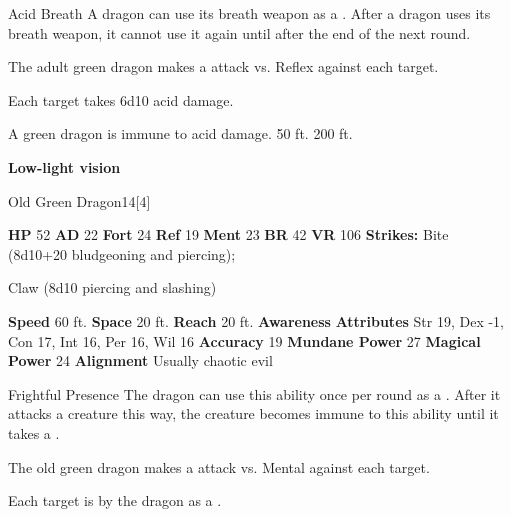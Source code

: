    \begin{freeability}{Acid Breath}
      A dragon can use its breath weapon as a .
      After a dragon uses its breath weapon, it cannot use it again until after the end of the next round.
      \par The adult green dragon makes a  attack
        vs. Reflex against each target.
    
    \hit Each target takes 6d10 acid damage.
    \end{freeability}
  
      
       A green dragon is immune to acid damage.
     50 ft.
     200 ft.
    \par\noindent\textbf{Low-light vision}
  

  \begin{monsubsection}{Old Green Dragon}{14}[4]
    \vspace{-1em}\vspace{-1em}
    \vspace{0em}

    
    

    \begin{spellcontent}
      \begin{spelltargetinginfo}
        \pari \textbf{HP} 52 \monsep
          \textbf{AD} 22 \monsep
          \textbf{Fort} 24 \monsep
          \textbf{Ref} 19 \monsep
          \textbf{Ment} 23
        \pari \textbf{BR} 42 \monsep
        \textbf{VR} 106
        \pari \textbf{Strikes:}
            Bite  (8d10+20 bludgeoning and piercing);
\par Claw  (8d10 piercing and slashing)
      \end{spelltargetinginfo}
    \end{spellcontent}
    \begin{monsterfooter}
      \pari \textbf{Speed} 60 ft. \monsep
        \textbf{Space} 20 ft. \monsep
        \textbf{Reach} 20 ft.
      \pari \textbf{Awareness} 
      \pari \textbf{Attributes}
        Str 19, Dex -1,
        Con 17, Int 16,
        Per 16, Wil 16
      \pari \textbf{Accuracy} 19 \monsep
        \textbf{Mundane Power} 27 \monsep
      \textbf{Magical Power} 24
      \pari \textbf{Alignment} Usually chaotic evil
    \end{monsterfooter}
  \end{monsubsection}
  \begin{freeability}{Frightful Presence}
      The dragon can use this ability once per round as a .
      After it attacks a creature this way, the creature becomes immune to this ability until it takes a .
      \par The old green dragon makes a  attack
        vs. Mental against each target.
    
    \hit Each target is  by the dragon as a .
    \end{freeability}
  

